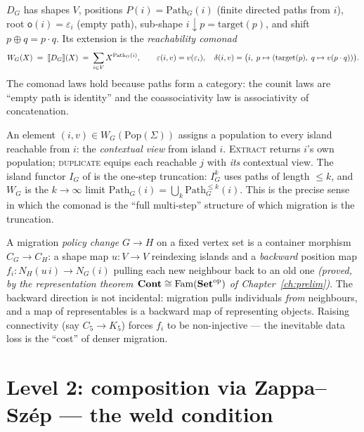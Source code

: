 \begin{definition}
\label{def:ga-reach}
$D_G$ has shapes $V$, positions $P(i)=\mathrm{Path}_G(i)$ (finite directed paths
from $i$), root $\mathsf{o}(i)=\varepsilon_i$ (empty path), sub-shape
$i\mathbin\downarrow p=\mathrm{target}(p)$, and shift $p\oplus q=p\cdot q$. Its
extension is the \emph{reachability comonad}
\[
   W_G(X)\;=\;\llbracket D_G \rrbracket(X)\;=\;\sum_{i\in V}X^{\mathrm{Path}_G(i)},
   \qquad
   \varepsilon(i,v)=v(\varepsilon_i),
   \quad
   \delta(i,v)=\bigl(i,\;p\mapsto(\mathrm{target}(p),\;q\mapsto v(p\cdot q))\bigr).
\]
The comonad laws hold because paths form a category: the counit laws are ``empty
path is identity'' and the coassociativity law is associativity of
concatenation.
\end{definition}

\begin{remark}
\label{rem:ga-contextual}
An element $(i,v)\in W_G(\mathrm{Pop}(\Sigma))$ assigns a population to every
island reachable from $i$: the \emph{contextual view} from island $i$.
\textsc{Extract} returns $i$'s own population; \textsc{duplicate} equips each
reachable $j$ with \emph{its} contextual view. The island functor $I_G$ of
\cite{langer-va-ga} is the one-step truncation: $I_G^{k}$ uses paths of length
$\le k$, and $W_G$ is the $k\to\infty$ limit
$\mathrm{Path}_G(i)=\bigcup_k\mathrm{Path}_G^{\le k}(i)$. This is the precise
sense in which the comonad is the ``full multi-step'' structure of which
migration is the truncation.
\end{remark}

A migration \emph{policy change} $G\to H$ on a fixed vertex set is a container
morphism $C_G\to C_H$: a shape map $u:V\to V$ reindexing islands and a
\emph{backward} position map $f_i:N_H(u\,i)\to N_G(i)$ pulling each new neighbour
back to an old one \emph{(proved, by the representation theorem
$\mathbf{Cont}\cong\mathrm{Fam}(\mathbf{Set}^{\mathrm{op}})$ of Chapter~\ref{ch:prelim})}. The backward direction
is not incidental: migration pulls individuals \emph{from} neighbours, and a
map of representables is a backward map of representing objects. Raising
connectivity (say $C_5\to K_5$) forces $f_i$ to be non-injective --- the
inevitable data loss is the ``cost'' of denser migration.

\section{Level 2: composition via Zappa--Sz\'ep --- the weld condition}
\label{sec:ga-level2}

